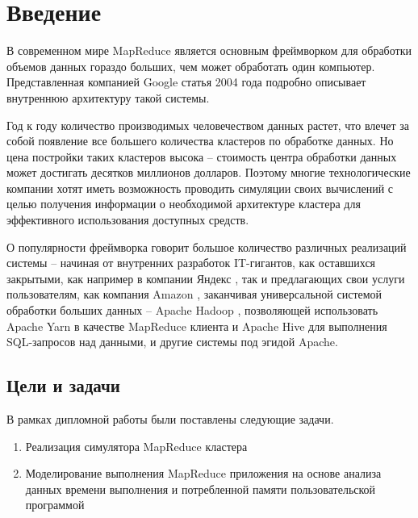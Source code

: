 \documentclass[../diploma.tex]{subfile}
\begin{document}
    \section{Введение}\label{sec:introduction}

    В современном мире MapReduce является основным фреймворком для обработки
    объемов данных гораздо больших, чем может обработать один компьютер.
    Представленная компанией Google статья \cite{google_mapreduce} 2004 года
    подробно описывает внутреннюю архитектуру такой системы. 

    Год к году количество производимых человечеством данных растет, что влечет
    за собой появление все большего количества кластеров по обработке данных. Но
    цена постройки таких кластеров высока -- стоимость центра обработки данных
    может достигать десятков миллионов долларов. Поэтому многие технологические
    компании хотят иметь возможность проводить симуляции своих вычислений с
    целью получения информации о необходимой архитектуре кластера для
    эффективного использования доступных средств.

    О популярности фреймворка говорит большое количество различных реализаций
    системы -- начиная от внутренних разработок IT-гигантов, как оставшихся
    закрытыми, как например в компании Яндекс \cite{yandex_yt}, так и
    предлагающих свои услуги пользователям, как компания Amazon
    \cite{amazon_emr}, заканчивая универсальной системой обработки больших
    данных -- Apache Hadoop \cite{apache_hadoop}, позволяющей использовать
    Apache Yarn \cite{apache_yarn} в качестве MapReduce клиента и Apache Hive
    \cite{apache_hive} для выполнения SQL-запросов над данными, и другие системы
    под эгидой Apache. 
    

    \subsection{Цели и задачи}\label{subsec:goals}

    В рамках дипломной работы были поставлены следующие задачи.

    \begin{enumerate}
        \item Реализация симулятора MapReduce кластера
        \item Моделирование выполнения MapReduce приложения на основе анализа
              данных времени выполнения и потребленной памяти пользовательской
              программой
    \end{enumerate}
\end{document}
